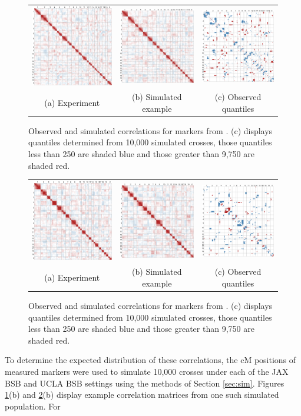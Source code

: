 \documentclass[12pt]{article}
\begin{document}
\begin{figure}[h!]
  \begin{center}
    \begin{tabular}{ccc}
      \includegraphics[scale = 0.26]{../img/jaxbsb.png} & \includegraphics[scale = 0.26]{../img/jaxbsb_sim.png} & \includegraphics[scale = 0.26]{../img/jaxbsb_quant.png} \\
      {\footnotesize (a) Experiment} & {\footnotesize (b) Simulated example} & {\footnotesize (c) Observed quantiles}
    \end{tabular}
  \end{center}
  \caption{Observed and simulated correlations for markers from \cite{roweetal1994jaxbsb}. (c) displays quantiles determined from 10,000 simulated crosses, those quantiles less than 250 are shaded blue and those greater than 9,750 are shaded red.}
  \label{fig:jaxbsb}
\end{figure}

\begin{figure}[h!]
  \begin{center}
    \begin{tabular}{ccc}
      \includegraphics[scale = 0.26]{../img/uclabsb.png} & \includegraphics[scale = 0.26]{../img/uclabsb_sim.png} & \includegraphics[scale = 0.26]{../img/uclabsb_quant.png} \\
      {\footnotesize (a) Experiment} & {\footnotesize (b) Simulated example} & {\footnotesize (c) Observed quantiles}
    \end{tabular}
  \end{center}
  \caption{Observed and simulated correlations for markers from \cite{welchetal1996uclabsb}. (c) displays quantiles determined from 10,000 simulated crosses, those quantiles less than 250 are shaded blue and those greater than 9,750 are shaded red.}
  \label{fig:uclabsb}
\end{figure}

To determine the expected distribution of these correlations, the cM positions of measured markers were used to simulate 10,000 crosses under each of the JAX BSB and UCLA BSB settings using the methods of Section \ref{sec:sim}. Figures \ref{fig:jaxbsb}(b) and \ref{fig:uclabsb}(b) display example correlation matrices from one such simulated population. For 
\end{document}
